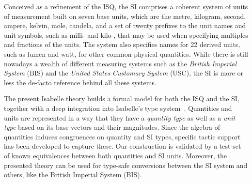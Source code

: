 \documentclass[11pt,a4paper]{book}
\begin{document}
Conceived as a refinement of the ISQ, the SI comprises a coherent system of units of measurement built on seven base
units, which are the metre, kilogram, second, ampere, kelvin, mole, candela, and a set of twenty prefixes to the unit
names and unit symbols, such as milli- and kilo-, that may be used when specifying multiples and fractions of the
units. The system also specifies names for 22 derived units, such as lumen and watt, for other common physical
quantities. While there is still nowadays a wealth of different measuring systems such as the \emph{British Imperial
  System} (BIS) and the \emph{United States Customary System} (USC), the SI is more or less the de-facto reference
behind all these systems.

The present Isabelle theory builds a formal model for both the ISQ and the SI, together with a deep integration into
Isabelle's type system~\cite{nipkow.ea:isabelle:2002}. Quantities and units are represented in a way that they have a
\emph{quantity type} as well as a \emph{unit type} based on its base vectors and their magnitudes. Since the algebra of
quantities induces congruences on quantity and SI types, specific tactic support has been developed to capture these.
Our construction is validated by a test-set of known equivalences between both quantities and SI units.  Moreover, the
presented theory can be used for type-safe conversions between the SI system and others, like the British Imperial
System (BIS).


% 
\end{document}
